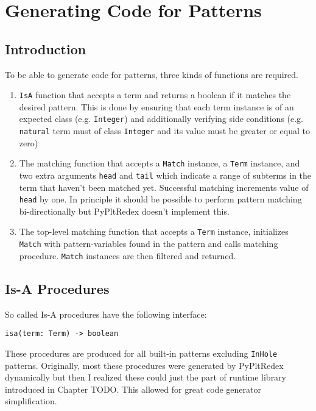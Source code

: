 \section{Generating Code for Patterns}

\subsection{Introduction}

To be able to generate code for patterns, three kinds of functions are required.

\begin{enumerate}
\item
\texttt{IsA} function that accepts a term and returns a boolean if it matches the desired pattern. This is done by ensuring that each term instance is of an expected class (e.g. \texttt{Integer}) and additionally verifying side conditions (e.g. \texttt{natural} term must of class \texttt{Integer} and its value must be greater or equal to zero)
\item
The matching function that accepts a \texttt{Match} instance, a \texttt{Term} instance, and two extra arguments \texttt{head} and \texttt{tail} which indicate a range of subterms in the term that haven't been matched yet. Successful matching increments value of \texttt{head} by one. In principle it should be possible to perform pattern matching bi-directionally but PyPltRedex doesn't implement this.
\item
The top-level matching function that accepts a \texttt{Term} instance, initializes \texttt{Match} with pattern-variables found in the pattern and calls matching procedure. \texttt{Match} instances are then filtered and returned.
\end{enumerate}


\subsection{Is-A Procedures}

So called Is-A procedures have the following interface:

\begin{lstlisting}
isa(term: Term) -> boolean
\end{lstlisting}

These procedures are produced for all built-in patterns excluding \texttt{InHole} patterns.  Originally, most these procedures were generated by PyPltRedex dynamically but then I realized these could just the part of runtime library introduced in Chapter TODO. This allowed for great code generator simplification.

